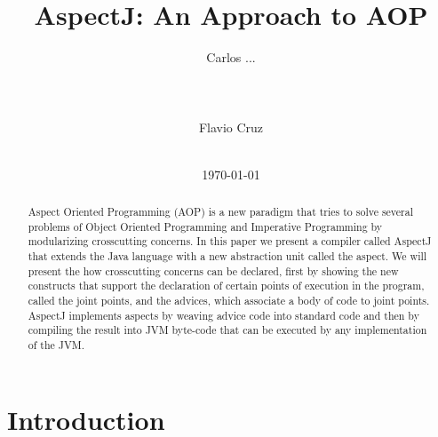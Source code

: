 \documentclass{template}
\begin{document}
\title{AspectJ: An Approach to AOP}


\author{
\alignauthor
Carlos ...\\
       \\
       \\
       \\
\alignauthor
Flavio Cruz\\
       \\
}
\date{\today}

\maketitle
\begin{abstract}
Aspect Oriented Programming (AOP) is a new paradigm that tries to solve several problems of
Object Oriented Programming and Imperative Programming by modularizing crosscutting concerns.
In this paper we present a compiler called AspectJ that extends
the Java language with a new abstraction unit called the aspect. We will present the
how crosscutting concerns can be declared, first by showing the new constructs that support
the declaration of certain points of execution in the program, called the joint points, and the
advices, which associate a body of code to joint points. AspectJ implements aspects by weaving advice
code into standard code and then by compiling the result into JVM byte-code that can be 
executed by any implementation of the JVM.
 
\end{abstract}


\section{Introduction}
\end{document}
